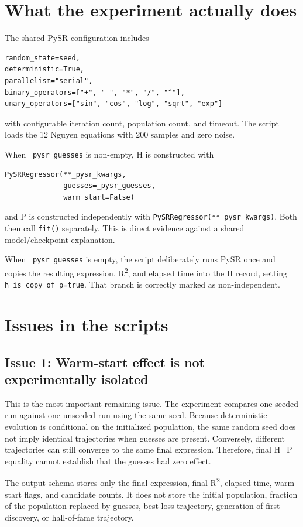 \documentclass[11pt]{article}
\begin{document}
\section{What the experiment actually does}

The shared PySR configuration includes
\begin{lstlisting}
random_state=seed,
deterministic=True,
parallelism="serial",
binary_operators=["+", "-", "*", "/", "^"],
unary_operators=["sin", "cos", "log", "sqrt", "exp"]
\end{lstlisting}
with configurable iteration count, population count, and timeout. The script loads the 12 Nguyen equations with 200 samples and zero noise.

When \texttt{\_pysr\_guesses} is non-empty, H is constructed with
\begin{lstlisting}
PySRRegressor(**_pysr_kwargs,
              guesses=_pysr_guesses,
              warm_start=False)
\end{lstlisting}
and P is constructed independently with \texttt{PySRRegressor(**\_pysr\_kwargs)}. Both then call \texttt{fit()} separately. This is direct evidence against a shared model/checkpoint explanation.

When \texttt{\_pysr\_guesses} is empty, the script deliberately runs PySR once and copies the resulting expression, R\textsuperscript{2}, and elapsed time into the H record, setting \texttt{h\_is\_copy\_of\_p=true}. That branch is correctly marked as non-independent.

\section{Issues in the scripts}

\subsection{Issue 1: Warm-start effect is not experimentally isolated}

This is the most important remaining issue. The experiment compares one seeded run against one unseeded run using the same seed. Because deterministic evolution is conditional on the initialized population, the same random seed does not imply identical trajectories when guesses are present. Conversely, different trajectories can still converge to the same final expression. Therefore, final H=P equality cannot establish that the guesses had zero effect.

The output schema stores only the final expression, final R\textsuperscript{2}, elapsed time, warm-start flags, and candidate counts. It does not store the initial population, fraction of the population replaced by guesses, best-loss trajectory, generation of first discovery, or hall-of-fame trajectory.
\end{document}
